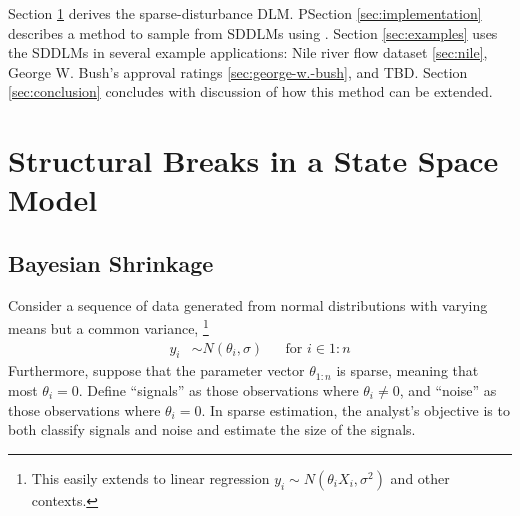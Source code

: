 \documentclass{article}
\begin{document}
Section \ref{sec:struct-breaks-state} derives the sparse-disturbance DLM.
PSection \ref{sec:implementation} describes a method to sample from SDDLMs using \Stan{}.
Section \ref{sec:examples} uses the SDDLMs in several example applications: Nile river flow dataset \ref{sec:nile}, George W. Bush's approval ratings \ref{sec:george-w.-bush}, and TBD.
Section \ref{sec:conclusion} concludes with discussion of how this
method can be extended.

\section{Structural Breaks in a State Space Model}
\label{sec:struct-breaks-state}

\subsection{Bayesian Shrinkage}
\label{sec:bayesian-shrinkage}

Consider a sequence of data generated from normal distributions with varying means but a common variance,%
\footnote{
  This easily extends to linear regression $y_{i} \sim N(\theta_{i} X_{i}, \sigma^{2})$ and other contexts.
}
\begin{align}
  \label{eq:13}
  y_{i} & \sim N(\theta_{i}, \sigma) & & \text{for $i \in 1:n$}
\end{align}
Furthermore, suppose that the parameter vector $\theta_{1:n}$ is sparse, meaning that most $\theta_{i} = 0$.
Define ``signals'' as those observations where $\theta_{i} \neq 0$, and ``noise'' as those observations where $\theta_{i} = 0$.
In sparse estimation, the analyst's objective is to both classify signals and noise and estimate the size of the signals.
\end{document}
